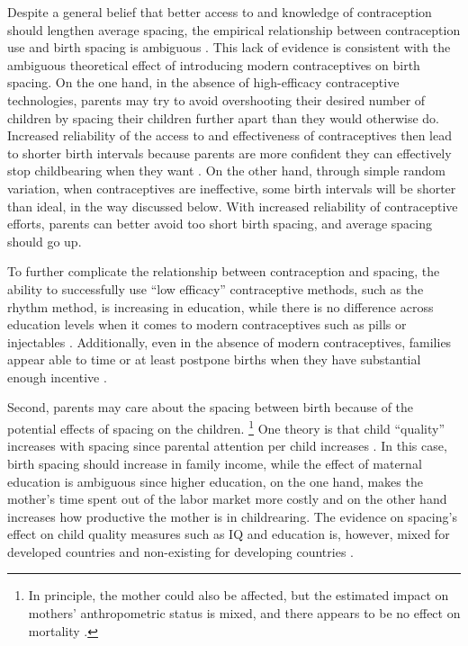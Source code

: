 Despite a general belief that better access to and knowledge of contraception 
should lengthen average spacing, the empirical relationship between contraception 
use and birth spacing is ambiguous 
\citep{Tulasidhar1993,Whitworth2002,Bhalotra2008,Yeakey2009,Kim2010,Soest2018}.
This lack of evidence is consistent with the ambiguous theoretical effect of introducing 
modern contraceptives on birth spacing.
On the one hand, in the absence of high-efficacy contraceptive technologies, parents may 
try to avoid overshooting their desired number of children by spacing their children 
further apart than they would otherwise do.
Increased reliability of the access to and effectiveness of contraceptives then lead to 
shorter birth intervals because parents are more confident they can effectively
stop childbearing when they want \citep{Keyfitz1971,Heckman1976}.
On the other hand, through simple random variation, when contraceptives are ineffective, 
some birth intervals will be shorter than ideal, in the way discussed below.
With increased reliability of contraceptive efforts, parents can better avoid too short 
birth spacing, and average spacing should go up.

To further complicate the relationship between contraception and spacing, the ability 
to successfully use ``low efficacy'' contraceptive methods, such as the rhythm method, 
is increasing in education, while there is no difference across education levels 
when it comes to modern contraceptives such as pills or injectables \citep{Rosenzweig1989}.
Additionally, even in the absence of modern contraceptives, families appear able to 
time or at least postpone births when they have substantial enough incentive 
\citep{Jayachandran2011,Alam2018}.


Second, parents may care about the spacing between birth because of the 
potential effects of spacing on the children.%
\footnote{
In principle, the mother could also be affected, but the estimated impact on 
mothers' anthropometric status is mixed, and there appears to be no 
effect on mortality 
\citep{Ronsmans1998,Menken2003,Dewey2007,Conde-Agudelo2012}.
}
One theory is that child ``quality'' increases with spacing 
since parental attention per child increases
\citep{Zajonc1975,Zajonc1976,Razin1980}.
In this case, birth spacing should increase in family income, while the 
effect of maternal education is ambiguous since higher education, on the 
one hand, makes the mother's time spent out of the labor market more 
costly and on the other hand increases how productive the mother is 
in childrearing.
The evidence on spacing's effect on child quality measures such as IQ 
and education is, however, mixed for developed countries and non-existing 
for developing countries
\citep{Powell1993,Pettersson-Lidbom2009,Buckles2012,Barclay2017}.

